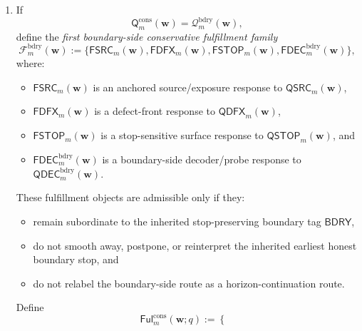 \begin{definition}
\begin{enumerate}[label=(\roman*)]
  Define
  \[
    \mathsf{Ful}^{\mathrm{cons}}_{m}(\mathbf w;q)
    :=
    \begin{cases}
      \mathsf{FMSH}_{m}(\mathbf w), & \text{if }q=\mathsf{QMSH}_{m}(\mathbf w),\\[2mm]
      \mathsf{FCRS}_{m}(\mathbf w), & \text{if }q=\mathsf{QCRS}_{m}(\mathbf w),\\[2mm]
      \mathsf{FPDE}_{m}(\mathbf w), & \text{if }q=\mathsf{QPDE}_{m}(\mathbf w),\\[2mm]
      \mathsf{FDEC}^{\mathrm{hor}}_{m}(\mathbf w), & \text{if }q=\mathsf{QDEC}^{\mathrm{hor}}_{m}(\mathbf w).
    \end{cases}
  \]
  \item If
  \[
    \mathsf{Q}^{\mathrm{cons}}_{m}(\mathbf w)=\mathcal Q^{\mathrm{bdry}}_{m}(\mathbf w),
  \]
  define the \emph{first boundary-side conservative fulfillment family}
  \[
    \mathcal F^{\mathrm{bdry}}_{m}(\mathbf w)
    :=
    \{\mathsf{FSRC}_{m}(\mathbf w),\mathsf{FDFX}_{m}(\mathbf w),\mathsf{FSTOP}_{m}(\mathbf w),\mathsf{FDEC}^{\mathrm{bdry}}_{m}(\mathbf w)\},
  \]
  where:
  \begin{itemize}[leftmargin=2em]
    \item \(\mathsf{FSRC}_{m}(\mathbf w)\) is an anchored source/exposure response to \(\mathsf{QSRC}_{m}(\mathbf w)\),
    \item \(\mathsf{FDFX}_{m}(\mathbf w)\) is a defect-front response to \(\mathsf{QDFX}_{m}(\mathbf w)\),
    \item \(\mathsf{FSTOP}_{m}(\mathbf w)\) is a stop-sensitive surface response to \(\mathsf{QSTOP}_{m}(\mathbf w)\), and
    \item \(\mathsf{FDEC}^{\mathrm{bdry}}_{m}(\mathbf w)\) is a boundary-side decoder/probe response to \(\mathsf{QDEC}^{\mathrm{bdry}}_{m}(\mathbf w)\).
  \end{itemize}
  These fulfillment objects are admissible only if they:
  \begin{itemize}[leftmargin=2em]
    \item remain subordinate to the inherited stop-preserving boundary tag \(\mathsf{BDRY}\),
    \item do not smooth away, postpone, or reinterpret the inherited earliest honest boundary stop, and
    \item do not relabel the boundary-side route as a horizon-continuation route.
  \end{itemize}
  Define
  \[
    \mathsf{Ful}^{\mathrm{cons}}_{m}(\mathbf w;q)
    :=
    \begin{cases}

\end{cases}\]
\end{enumerate}
\end{definition}
